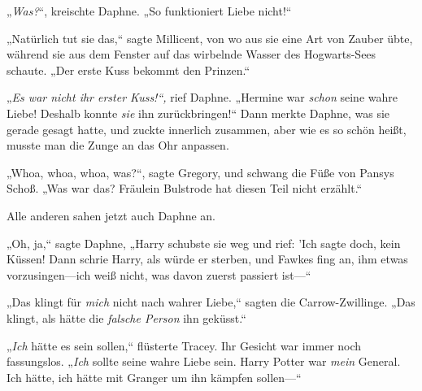 „\emph{Was?}“, kreischte Daphne. „So funktioniert Liebe nicht!“

„Natürlich tut sie das,“ sagte Millicent, von wo aus sie eine Art von Zauber übte, während sie aus dem Fenster auf das wirbelnde Wasser des Hogwarts-Sees schaute. „Der erste Kuss bekommt den Prinzen.“

„\emph{Es war nicht ihr erster Kuss!“,} rief Daphne. „Hermine war \emph{schon} seine wahre Liebe! Deshalb konnte \emph{sie} ihn zurückbringen!“ Dann merkte Daphne, was sie gerade gesagt hatte, und zuckte innerlich zusammen, aber wie es so schön heißt, musste man die Zunge an das Ohr anpassen.

„Whoa, whoa, whoa, was?“, sagte Gregory, und schwang die Füße von Pansys Schoß. „Was war das? Fräulein Bulstrode hat diesen Teil nicht erzählt.“

Alle anderen sahen jetzt auch Daphne an.

„Oh, ja,“ sagte Daphne, „Harry schubste sie weg und rief: 'Ich sagte doch, kein Küssen! Dann schrie Harry, als würde er sterben, und Fawkes fing an, ihm etwas vorzusingen—ich weiß nicht, was davon zuerst passiert ist—“

„Das klingt für \emph{mich} nicht nach wahrer Liebe,“ sagten die Carrow-Zwillinge. „Das klingt, als hätte die \emph{falsche Person} ihn geküsst.“

„\emph{Ich} hätte es sein sollen,“ flüsterte Tracey. Ihr Gesicht war immer noch fassungslos. „\emph{Ich} sollte seine wahre Liebe sein. Harry Potter war \emph{mein} General. Ich hätte, ich hätte mit Granger um ihn kämpfen sollen—“

